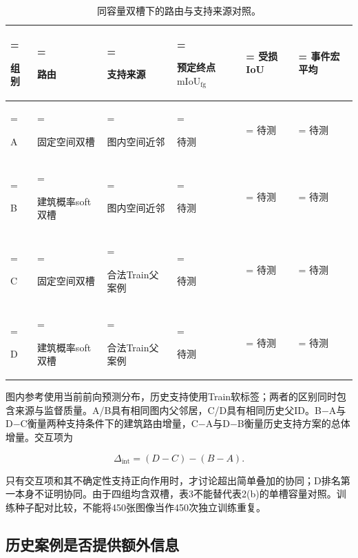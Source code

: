 \documentclass[UTF8,a4paper,zihao=-4,fontset=none]{ctexart}
\begin{document}
\begin{table}[!htbp]
\centering
\renewcommand{\thetable}{3}
\caption{同容量双槽下的路由与支持来源对照。}
\label{tab:3}
\small
\setlength{\tabcolsep}{3.5pt}
\renewcommand{\arraystretch}{1.3}
\begin{tabularx}{\linewidth}{@{}>{\hsize=0.400000\hsize\linewidth=\hsize\raggedright\arraybackslash}X>{\hsize=1.450000\hsize\linewidth=\hsize\raggedright\arraybackslash}X>{\hsize=1.400000\hsize\linewidth=\hsize\raggedright\arraybackslash}X>{\hsize=1.200000\hsize\linewidth=\hsize\raggedright\arraybackslash}X>{\hsize=0.700000\hsize\linewidth=\hsize\centering\arraybackslash}X>{\hsize=0.850000\hsize\linewidth=\hsize\centering\arraybackslash}X@{}}
\toprule
\textbf{组别} & \textbf{路由} & \textbf{支持来源} & \textbf{预定终点\(\mathrm{mIoU}_{\mathrm{fg}}\)} & \textbf{受损IoU} & \textbf{事件宏平均} \\
\midrule
A & 固定空间双槽 & 图内空间近邻 & 待测 & 待测 & 待测 \\
B & 建筑概率soft双槽 & 图内空间近邻 & 待测 & 待测 & 待测 \\
C & 固定空间双槽 & 合法Train父案例 & 待测 & 待测 & 待测 \\
D & 建筑概率soft双槽 & 合法Train父案例 & 待测 & 待测 & 待测 \\
\bottomrule
\end{tabularx}
\end{table}

图内参考使用当前前向预测分布，历史支持使用Train软标签；两者的区别同时包含来源与监督质量。A/B具有相同图内父邻居，C/D具有相同历史父ID。B\( - \)A与D\( - \)C衡量两种支持条件下的建筑路由增量，C\( - \)A与D\( - \)B衡量历史支持方案的总体增量。交互项为

\begin{equation}
\label{eq:13}
\Delta_{\mathrm{int}}=(D-C)-(B-A).
\end{equation}

只有交互项和其不确定性支持正向作用时，才讨论超出简单叠加的协同；D排名第一本身不证明协同。由于四组均含双槽，表3不能替代表2(b)的单槽容量对照。训练种子配对比较，不能将450张图像当作450次独立训练重复。

\FloatBarrier

\subsection{历史案例是否提供额外信息}
\end{document}
